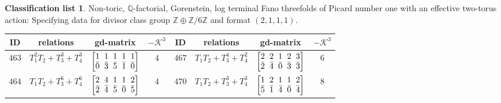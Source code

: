 \documentclass[pdftex]{sigma}%
\theoremstyle{definition}
\newtheorem{class-list}[thm]{Classification list}
\def\ZZ{{\mathbb Z}}
\def\QQ{{\mathbb Q}}
\numberwithin{equation}{section}
\begin{document}
\begin{class-list}
Non-toric, $\QQ$-factorial, Gorenstein, log terminal Fano
threefolds of Picard number one with an effective two-torus action:
Specifying data for divisor class group $\ZZ\oplus \ZZ/6\ZZ$ and
format $(2,1,1,1)$.
\begin{table}[h!]\centering\setlength{\tabcolsep}{3.5pt}
\renewcommand{\arraystretch}{1.1}\small\tabulinesep=1mm
\begin{tabu}{c|c|c|c||c|c|c|c}
\hline
ID&relations&gd-matrix&$-\mathcal{K}^3$&ID&relations&gd-matrix&$-\mathcal{K}^3$
\\
\hline
${463}$&${T_{1}^{2}T_{2}+T_{3}^{3}+T_{4}^{3}}$
&$\arraycolsep=1mm\begin{bmatrix}{1} & {1} & {1} & {1} & {1} \\ {\bar{0}} & {\bar{3}} & {\bar{5}} & {\bar{1}} & {\bar{0}}\end{bmatrix}$&${4}$
&${467}$&${T_{1}T_{2}+T_{3}^{4}+T_{4}^{2}}$
&$\arraycolsep=1mm\begin{bmatrix}{2} & {2} & {1} & {2} & {3} \\ {\bar{2}} & {\bar{4}} & {\bar{0}} & {\bar{3}} & {\bar{3}}\end{bmatrix}$&${6}$
\\
\hline
${464}$&${T_{1}T_{2}+T_{3}^{6}+T_{4}^{6}}$
&$\arraycolsep=1mm\begin{bmatrix}{2} & {4} & {1} & {1} & {2} \\ {\bar{2}} & {\bar{4}} & {\bar{5}} & {\bar{0}} & {\bar{5}}\end{bmatrix}$&${4}$
&${470}$&${T_{1}T_{2}+T_{3}^{3}+T_{4}^{3}}$
&$\arraycolsep=1mm\begin{bmatrix}{1} & {2} & {1} & {1} & {2} \\ {\bar{5}} & {\bar{1}} & {\bar{4}} & {\bar{0}} & {\bar{4}}\end{bmatrix}$&${8}$
\\
\hline
\end{tabu}\vspace{-2mm}
\end{table}
\end{class-list}
\end{document}
